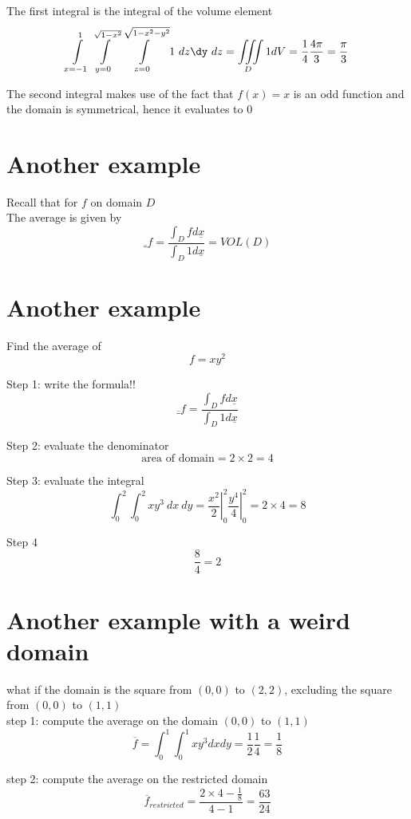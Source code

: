 The first integral is the integral of the volume element
\[
   \int \limits_{x=-1}^{1} \int \limits_{y=0}^{\sqrt{1-x^2}} \int \limits_{z=0}^{\sqrt{1-x^2 - y^2}}  1 \ dz \dy\ dz  =  \iiint \limits_{D}^{} 1 dV = \frac{1}{4} \frac{4 \pi}{3}  = \frac{\pi}{3}
\] 

The second integral makes use of the fact that $f(x) = x$ is an odd function and the domain is symmetrical, hence it evaluates to 0

\section{Another example}

Recall that for $f$ on domain $D$ \\

The average is given by
\[
   \overline_{f} = \frac{
      \int_{D} f d \underline{x}
   }{
      \int_{D} 1 d \underline{x} 
   } = VOL(D)
\] 

\section{Another example}
Find the average of 
\[
  f = xy^2
\] 

Step 1: write the formula!!
\[
   \overline_{f} = \frac{\int_{D} f d \underline{x}}{\int_{D} 1 d \underline{x}}
\] 

Step 2: evaluate the denominator
\[
   \text{area of domain} = 2 \times 2 = 4
\] 

Step 3: evaluate the integral
\[
   \int_{0}^{2} \int_{0}^{2} xy^3\ dx\ dy = \left. \frac{x^2}{2} \right|_{0}^{2} \left. \frac{y^4}{4} \right|_{0}^{2} = 2 \times 4 = 8
\] 

Step 4
\[
  \frac{8}{4} = 2
\] 

\section{Another example with a weird domain}

what if the domain is the square from $(0,0)$ to $(2,2)$, excluding the square from $(0,0)$ to $(1,1)$ \\

step 1: compute the average on the domain $(0,0)$ to $(1,1)$
\[
   \overline{f} = \int_{0}^{1} \int_{0}^{1}  xy^3 dx dy = \frac{1}{2} \frac{1}{4} = \frac{1}{8}  
\] 

step 2: compute the average on the restricted domain
\[
   \overline{f}_{restricted} = \frac{2 \times 4 - \frac{1}{8}}{4 -1} = \frac{63}{24}
\] 





